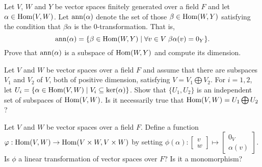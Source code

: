\probskip

\begin{problem}[Golan 251]
Let $V$, $W$ and $Y$ be vector spaces finitely generated over a field $F$ and let 
$\alpha \in \operatorname{Hom}(V, W)$.  Let $\operatorname{ann}(\alpha)$ denote the set of those 
$\beta \in \operatorname{Hom}(W,Y)$ satisfying the condition that $\beta\alpha$ is the 0-transformation.
That is, 
\[
\operatorname{ann}(\alpha) = \{ \beta\in \operatorname{Hom}(W,Y) \mid \forall v \in V \; \beta\alpha(v) = 0_Y\}.
\]
Prove that $\operatorname{ann}(\alpha)$ is a subspace of  $\operatorname{Hom}(W,Y)$ and compute its
dimension.
\end{problem}

\probskip

\begin{ex}[Golan 253]
Let $V$ and $W$ be vector spaces over a field $F$ and assume that there are
subspaces $V_1$ and $V_2$ of $V$, both of positive dimension, satisfying
$V = V_1 \bigoplus V_2$.  For  $i=1, 2$, let 
$U_i = \{\alpha \in \operatorname{Hom}(V,W) \mid V_i \subseteq \operatorname{ker}(\alpha)\}$.
Show that $\{U_1, U_2\}$ is an independent set of subspaces of $\operatorname{Hom}(V,W)$.
Is it necessarily true that $\operatorname{Hom}(V,W) = U_1 \bigoplus U_2$?
\end{ex}

\probskip

\begin{problem}[Golan 256]
Let $V$ and $W$ be vector spaces over a field $F$.
Define a function $\varphi : \operatorname{Hom}(V, W) \rightarrow \operatorname{Hom}(V\times W, V\times W)$
by setting
$\phi(\alpha): 
\begin{bmatrix} v\\ w \end{bmatrix} 
\mapsto 
\begin{bmatrix} 0_V\\ \alpha(v) \end{bmatrix}$.
Is $\phi$ a linear transformation of vector spaces over $F$? Is it a monomorphism?
\end{problem}

